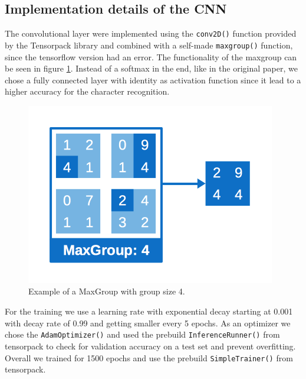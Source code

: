 \documentclass{utue} %
\begin{document}
\subsection{Implementation details of the CNN}
The convolutional layer were implemented using the \texttt{conv2D()} function provided by the Tensorpack library and combined with a self-made \texttt{maxgroup()} function, since the tensorflow version had an error. The functionality of the maxgroup can be seen in figure \ref{fig:impl_maxgroup}. Instead of a softmax in the end, like in the original paper, we chose a fully connected layer with identity as activation function since it lead to a higher accuracy for the character recognition. \\
\begin{figure}[h!]
	\centering
	\includegraphics[width=.9\columnwidth]{graphics/impl_maxgroups.png}
	\caption{\label{fig:impl_maxgroup} Example of a MaxGroup with group size 4.}
\end{figure}

For the training we use a learning rate with exponential decay starting at 0.001 with decay rate of 0.99 and getting smaller every 5 epochs. As an optimizer we chose the \texttt{AdamOptimizer()} and used the prebuild \texttt{InferenceRunner()} from tensorpack to check for validation accuracy on a test set and prevent overfitting. Overall we trained for 1500 epochs and use the prebuild \texttt{SimpleTrainer()} from tensorpack. 
\end{document}
